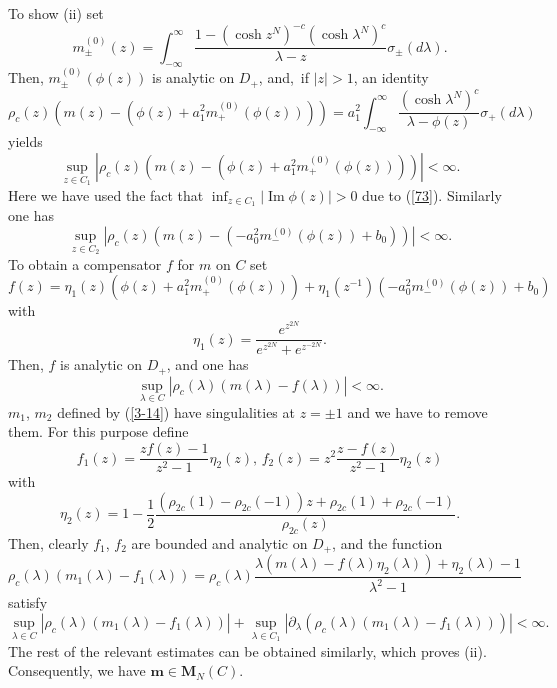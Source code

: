\documentclass[a4paper]{article}%
\begin{document}
To show (ii) set%
\[
m_{\pm}^{\left(  0\right)  }\left(  z\right)  =\int_{-\infty}^{\infty}%
\dfrac{1-\left(  \cosh z^{N}\right)  ^{-c}\left(  \cosh\lambda^{N}\right)
^{c}}{\lambda-z}\sigma_{\pm}\left(  d\lambda\right)  \text{.}%
\]
Then, $m_{\pm}^{\left(  0\right)  }\left(  \phi\left(  z\right)  \right)  $ is
analytic on $D_{+}$, and,\ if $\left\vert z\right\vert >1$, an identity
\[
\rho_{c}(z)\left(  m\left(  z\right)  -\left(  \phi\left(  z\right)
+a_{1}^{2}m_{+}^{\left(  0\right)  }\left(  \phi\left(  z\right)  \right)
\right)  \right)  =a_{1}^{2}\int_{-\infty}^{\infty}\dfrac{\left(  \cosh
\lambda^{N}\right)  ^{c}}{\lambda-\phi\left(  z\right)  }\sigma_{+}\left(
d\lambda\right)
\]
yields%
\[
\sup_{z\in C_{1}}\left\vert \rho_{c}(z)\left(  m\left(  z\right)  -\left(
\phi\left(  z\right)  +a_{1}^{2}m_{+}^{\left(  0\right)  }\left(  \phi\left(
z\right)  \right)  \right)  \right)  \right\vert <\infty\text{.}%
\]
Here we have used the fact that $\inf_{z\in C_{1}}\left\vert \operatorname{Im}%
\phi\left(  z\right)  \right\vert >0$ due to (\ref{73}). Similarly one has
\[
\sup_{z\in C_{2}}\left\vert \rho_{c}(z)\left(  m\left(  z\right)  -\left(
-a_{0}^{2}m_{-}^{\left(  0\right)  }\left(  \phi\left(  z\right)  \right)
+b_{0}\right)  \right)  \right\vert <\infty\text{.}%
\]
To obtain a compensator $f$ for $m$ on $C$ set%
\[
f(z)=\eta_{1}(z)\left(  \phi\left(  z\right)  +a_{1}^{2}m_{+}^{\left(
0\right)  }\left(  \phi\left(  z\right)  \right)  \right)  +\eta_{1}%
(z^{-1})\left(  -a_{0}^{2}m_{-}^{\left(  0\right)  }\left(  \phi\left(
z\right)  \right)  +b_{0}\right)
\]
with%
\[
\eta_{1}(z)=\dfrac{e^{z^{2N}}}{e^{z^{2N}}+e^{z^{-2N}}}\text{.}%
\]
Then, $f$ is analytic on $D_{+}$, and one has%
\[
\sup_{\lambda\in C}\left\vert \rho_{c}(\lambda)\left(  m\left(  \lambda
\right)  -f(\lambda)\right)  \right\vert <\infty\text{.}%
\]
$m_{1}$, $m_{2}$ defined by (\ref{3-14}) have singulalities at $z=\pm1$ and we
have to remove them. For this purpose define%
\begin{equation}
f_{1}(z)=\dfrac{zf(z)-1}{z^{2}-1}\eta_{2}(z)\text{, \ \ }f_{2}(z)=z^{2}%
\dfrac{z-f(z)}{z^{2}-1}\eta_{2}(z) \label{3-15}%
\end{equation}
with%
\[
\eta_{2}(z)=1-\dfrac{1}{2}\dfrac{\left(  \rho_{2c}(1)-\rho_{2c}(-1)\right)
z+\rho_{2c}(1)+\rho_{2c}(-1)}{\rho_{2c}(z)}\text{.}%
\]
Then, clearly $f_{1}$, $f_{2}$ are bounded and analytic on $D_{+}$, and the
function
\[
\rho_{c}(\lambda)\left(  m_{1}(\lambda)-f_{1}(\lambda)\right)  =\rho
_{c}(\lambda)\dfrac{\lambda\left(  m(\lambda)-f(\lambda)\eta_{2}%
(\lambda)\right)  +\eta_{2}(\lambda)-1}{\lambda^{2}-1}%
\]
satisfy%
\[
\sup_{\lambda\in C}\left\vert \rho_{c}(\lambda)\left(  m_{1}(\lambda
)-f_{1}(\lambda)\right)  \right\vert +\sup_{\lambda\in C_{1}}\left\vert
\partial_{\lambda}\left(  \rho_{c}(\lambda)\left(  m_{1}(\lambda
)-f_{1}(\lambda)\right)  \right)  \right\vert <\infty\text{.}%
\]
The rest of the relevant estimates can be obtained similarly, which proves
(ii). Consequently, we have $\boldsymbol{m}\in\boldsymbol{M}_{N}\left(
C\right)  $.
\end{document}
